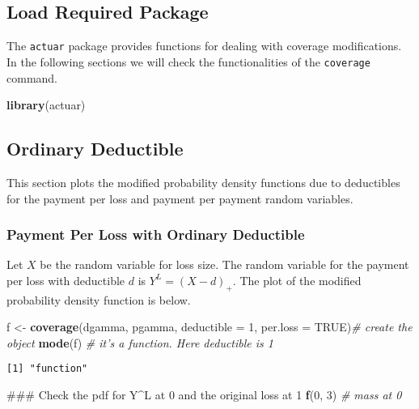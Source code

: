 \documentclass[]{book}
\newenvironment{Shaded}{\begin{snugshade}}{\end{snugshade}}
\newcommand{\KeywordTok}[1]{\textcolor[rgb]{0.13,0.29,0.53}{\textbf{#1}}}
\newcommand{\DataTypeTok}[1]{\textcolor[rgb]{0.13,0.29,0.53}{#1}}
\newcommand{\DecValTok}[1]{\textcolor[rgb]{0.00,0.00,0.81}{#1}}
\newcommand{\StringTok}[1]{\textcolor[rgb]{0.31,0.60,0.02}{#1}}
\newcommand{\CommentTok}[1]{\textcolor[rgb]{0.56,0.35,0.01}{\textit{#1}}}
\newcommand{\OtherTok}[1]{\textcolor[rgb]{0.56,0.35,0.01}{#1}}
\newcommand{\NormalTok}[1]{#1}
\theoremstyle{definition}
\theoremstyle{definition}
\theoremstyle{definition}
\theoremstyle{remark}
\begin{document}
\subsection{Load Required Package}\label{load-required-package}

The \texttt{actuar} package provides functions for dealing with coverage
modifications. In the following sections we will check the
functionalities of the \texttt{coverage} command.

\begin{Shaded}
\begin{Highlighting}[]
\KeywordTok{library}\NormalTok{(actuar)}
\end{Highlighting}
\end{Shaded}

\subsection{Ordinary Deductible}\label{ordinary-deductible}

This section plots the modified probability density functions due to
deductibles for the payment per loss and payment per payment random
variables.

\subsubsection{Payment Per Loss with Ordinary
Deductible}\label{payment-per-loss-with-ordinary-deductible}

Let \(X\) be the random variable for loss size. The random variable for
the payment per loss with deductible \(d\) is \(Y^L=(X-d)_+\). The plot
of the modified probability density function is below.

\begin{Shaded}
\begin{Highlighting}[]
\NormalTok{f <-}\StringTok{ }\KeywordTok{coverage}\NormalTok{(dgamma, pgamma, }\DataTypeTok{deductible =} \DecValTok{1}\NormalTok{, }\DataTypeTok{per.loss =} \OtherTok{TRUE}\NormalTok{)}\CommentTok{# create the object}
\KeywordTok{mode}\NormalTok{(f) }\CommentTok{# it's a function. Here deductible is 1}
\end{Highlighting}
\end{Shaded}

\begin{verbatim}
[1] "function"
\end{verbatim}

\begin{Shaded}
\begin{Highlighting}[]
\NormalTok{### Check the pdf for Y^L at 0 and the original loss at 1}
\KeywordTok{f}\NormalTok{(}\DecValTok{0}\NormalTok{, }\DecValTok{3}\NormalTok{) }\CommentTok{# mass at 0}
\end{Highlighting}
\end{Shaded}
\end{document}
